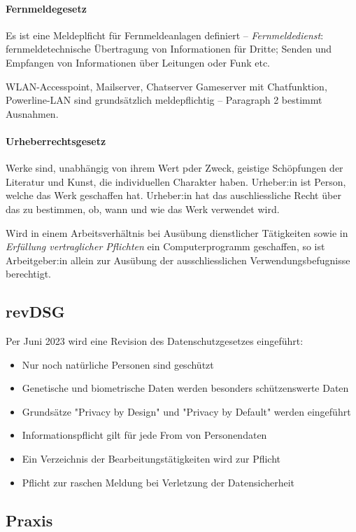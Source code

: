 \documentclass[a4paper,12pt]{article}
\begin{document}
\paragraph{Fernmeldegesetz} Es ist eine Meldeplficht für Fernmeldeanlagen definiert -- \emph{Fernmeldedienst}: fernmeldetechnische Übertragung von Informationen für Dritte; Senden und Empfangen von Informationen über Leitungen oder Funk etc.

WLAN-Accesspoint, Mailserver, Chatserver Gameserver mit Chatfunktion, Powerline-LAN sind grundsätzlich meldepflichtig -- Paragraph 2 bestimmt Ausnahmen.

\paragraph{Urheberrechtsgesetz} Werke sind, unabhängig von ihrem Wert pder Zweck, geistige Schöpfungen der Literatur und Kunst, die individuellen Charakter haben. Urheber:in ist Person, welche das Werk geschaffen hat. Urheber:in hat das auschliessliche Recht über das zu bestimmen, ob, wann und wie das Werk verwendet wird.

Wird in einem Arbeitsverhältnis bei Ausübung dienstlicher Tätigkeiten sowie in \emph{Erfüllung vertraglicher Pflichten} ein Computerprogramm geschaffen, so ist Arbeitgeber:in allein zur Ausübung der ausschliesslichen Verwendungsbefugnisse berechtigt.

\subsection{revDSG}
Per Juni 2023 wird eine Revision des Datenschutzgesetzes eingeführt:
\begin{itemize}
\item Nur noch natürliche Personen sind geschützt
\item Genetische und biometrische Daten werden besonders schützenswerte Daten
\item Grundsätze "Privacy by Design" und "Privacy by Default" werden eingeführt
\item Informationspflicht gilt für jede From von Personendaten
\item Ein Verzeichnis der Bearbeitungstätigkeiten wird zur Pflicht
\item Pflicht zur raschen Meldung bei Verletzung der Datensicherheit
\end{itemize}

\subsection{Praxis}
\end{document}

